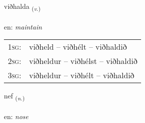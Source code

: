 \documentclass[frontgrid, backgrid]{flacards}\usepackage[]{graphicx}\usepackage[]{color}
\begin{document}
\renewcommand{\blhead}{\vskip5pt {\small\bfseries\footnotesize Sagnorð | Verb }}
\renewcommand{\bcfoot}{\vskip5pt \hspace{2pt}{\small\bfseries\footnotesize 2K}}


{viðhalda \small{\textsubscript{(\textit{v.})}} \\[1ex] %
\textphonetic{[vɪθhalta]} \\
en: \emph{maintain} \\  [2ex]
\renewcommand*{\arraystretch}{0.8}
\begin{tabular}{p{1cm}l}
\textsc{1sg}: & viðheld -- viðhélt -- viðhaldið \\ 
\textsc{2sg}: & viðheldur -- viðhélst -- viðhaldið \\ 
\textsc{3sg}: & viðheldur -- viðhélt -- viðhaldið \\ 
\end{tabular}
}

\renewcommand{\flhead}{\vskip5pt \fboxsep=0pt {\small\bfseries\footnotesize Nafnorð | Noun}}
\renewcommand{\fcfoot}{\vskip5pt \fboxsep=0pt \hspace{2pt}{\small\bfseries\footnotesize 2K}}

\renewcommand{\blhead}{\vskip5pt {\small\bfseries\footnotesize Nafnorð | Noun }}
\renewcommand{\bcfoot}{\vskip5pt \hspace{2pt}{\small\bfseries\footnotesize 2K}}


{nef \small{\textsubscript{(\textit{n.})}} \\[1ex] %
\textphonetic{[nɛːv]} \\
en: \emph{nose} \\  [2ex]
\renewcommand*{\arraystretch}{0.8}
}

\renewcommand{\flhead}{\vskip5pt \fboxsep=0pt {\small\bfseries\footnotesize Nafnorð | Noun}}
\renewcommand{\fcfoot}{\vskip5pt \fboxsep=0pt \hspace{2pt}{\small\bfseries\footnotesize 2K}}
\end{document}
